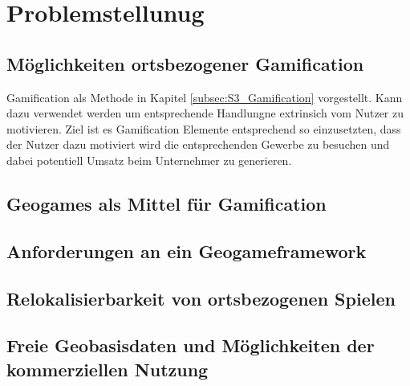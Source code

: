 \chapter{Problemstellunug}
\label{sec:S2_Problemstellunug}

\section{Möglichkeiten ortsbezogener Gamification}

Gamification als Methode in Kapitel \ref{subsec:S3_Gamification} vorgestellt.
Kann dazu verwendet werden um entsprechende Handlungne extrinsich vom Nutzer zu motivieren.
Ziel ist es Gamification Elemente entsprechend so einzusetzten, dass der Nutzer dazu motiviert wird die entsprechenden Gewerbe zu besuchen und dabei potentiell Umsatz beim Unternehmer zu generieren.
 

\section{Geogames als Mittel für Gamification}

\section{Anforderungen an ein Geogameframework}

\section{Relokalisierbarkeit von ortsbezogenen Spielen}

\section{Freie Geobasisdaten und Möglichkeiten der kommerziellen Nutzung}